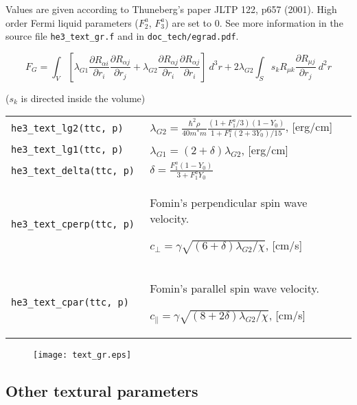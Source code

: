 \documentclass[a4paper]{article}
\begin{document}
Values are given according to Thuneberg's paper JLTP 122, p657 (2001).
High order Fermi liquid parameters ($F_2^a$, $F_3^a$) are set to 0.
See more information in the source file {\tt he3\_text\_gr.f} and in
{\tt doc\_tech/egrad.pdf}.

$$
F_{G}  = \int_V \left[
  \lambda_{G1}\frac{\partial R_{\alpha i}}{\partial r_i}
              \frac{\partial R_{\alpha j}}{\partial r_j} +
  \lambda_{G2}\frac{\partial R_{\alpha j}}{\partial r_i}
              \frac{\partial R_{\alpha j}}{\partial r_i}
  \right]\ d^3r
+ 2\lambda_{G2} \int_S s_k R_{\mu k} \frac{\partial R_{\mu j}}{\partial r_j}\ d^2r
$$

($s_k$ is directed inside the volume)

\medskip
\noindent\begin{tabular}{lp{11cm}}

\tt he3\_text\_lg2(ttc, p) & $\lambda_{G2} = \displaystyle
\frac{\hbar^2 \rho}{40 m^* m}
\frac{(1 + F_1^a/3)(1-Y_0)}{1+F_1^a (2+3Y_0)/15} $, [erg/cm]\\[2mm]

\tt he3\_text\_lg1(ttc, p) & $\lambda_{G1} = \displaystyle
(2+\delta) \lambda_{G2}$, [erg/cm]\\[2mm]

\tt he3\_text\_delta(ttc, p) & $\delta = \displaystyle
\frac{F_1^a (1-Y_0)}{3 + F_1^a Y_0} $\\[2mm]

\tt he3\_text\_cperp(ttc, p) & Fomin's perpendicular spin wave velocity.\par
$c_\perp = \displaystyle \gamma\sqrt{(6+\delta)\lambda_{G2}/\chi} $, [cm/s]\\

\tt he3\_text\_cpar(ttc, p) & Fomin's parallel spin wave velocity.\par
$c_\parallel = \displaystyle \gamma\sqrt{(8+2\delta)\lambda_{G2}/\chi} $, [cm/s]\\

\end{tabular}
\medskip

\begin{figure}[h]
\texttt{[image: text\_gr.eps]}\\
\end{figure}

\eject
\subsection*{Other textural parameters}
\end{document}
